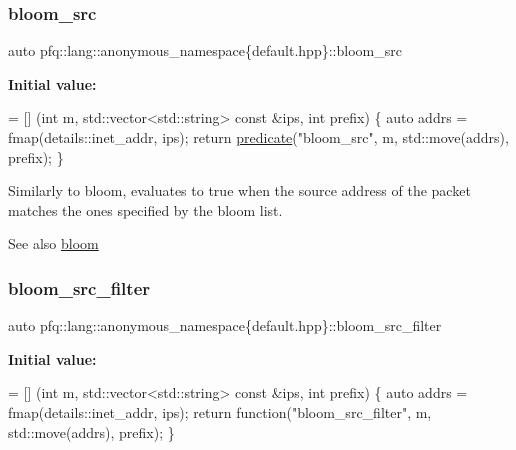 \subsubsection{\texorpdfstring{bloom\+\_\+src}{bloom\_src}}
{\footnotesize\ttfamily auto pfq\+::lang\+::anonymous\+\_\+namespace\{default.\+hpp\}\+::bloom\+\_\+src}

{\bfseries Initial value\+:}
\begin{DoxyCode}
= [] (\textcolor{keywordtype}{int} m, std::vector<std::string> \textcolor{keyword}{const} &ips, \textcolor{keywordtype}{int} prefix) \{
                                \textcolor{keyword}{auto} addrs = fmap(details::inet\_addr, ips);
                                \textcolor{keywordflow}{return} \hyperlink{namespacepfq_1_1lang_aca9adafc436b7f851621b979fa1aaf88}{predicate}(\textcolor{stringliteral}{"bloom\_src"}, m, std::move(addrs), prefix);
                          \}
\end{DoxyCode}
Similarly to {\ttfamily bloom}, evaluates to {\ttfamily true} when the source address of the packet matches the ones specified by the bloom list. \begin{DoxySeeAlso}{See also}
\hyperlink{namespacepfq_1_1lang_1_1anonymous__namespace_02default_8hpp_03_abfcd230137acb93cfd99f7a0a7c1f17f}{bloom} 
\end{DoxySeeAlso}
\mbox{\label{namespacepfq_1_1lang_1_1anonymous__namespace_02default_8hpp_03_a04d4dfefacab3230f7d17f0f797cd37e}} 
\subsubsection{\texorpdfstring{bloom\+\_\+src\+\_\+filter}{bloom\_src\_filter}}
{\footnotesize\ttfamily auto pfq\+::lang\+::anonymous\+\_\+namespace\{default.\+hpp\}\+::bloom\+\_\+src\+\_\+filter}

{\bfseries Initial value\+:}
\begin{DoxyCode}
= [] (\textcolor{keywordtype}{int} m, std::vector<std::string> \textcolor{keyword}{const} &ips, \textcolor{keywordtype}{int} prefix) \{
                                    \textcolor{keyword}{auto} addrs = fmap(details::inet\_addr, ips);
                                    \textcolor{keywordflow}{return} \textcolor{keyword}{function}(\textcolor{stringliteral}{"bloom\_src\_filter"}, m, std::move(addrs), prefix);
                                \}
\end{DoxyCode}


